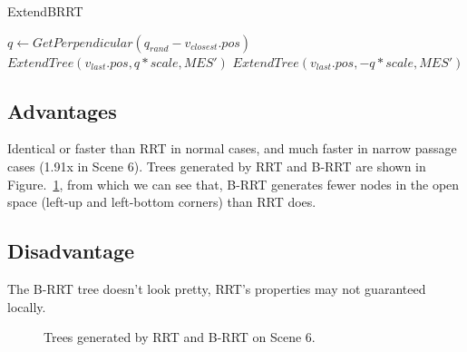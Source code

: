 \documentclass[11pt, oneside]{article}   	%
\begin{document}
\begin{algorithm}                      	
\caption{ExtendBRRT}
\label{alg:extendBRRT}                     	
\begin{algorithmic}
	\State $q \gets GetPerpendicular(q_{rand} - v_{closest}.pos)$
	\State $ExtendTree(v_{last}.pos, q*scale, MES')$
	\State $ExtendTree(v_{last}.pos, -q*scale, MES')$
\EndIf
\end{algorithmic}
\end{algorithm}

\subsection{Advantages}
Identical or faster than RRT in normal cases, and much faster in narrow passage cases (1.91x in Scene 6). 
Trees generated by RRT and B-RRT are shown in Figure.~\ref{fig:trees}, 
from which we can see that, B-RRT generates fewer nodes in the open space (left-up and left-bottom corners) than RRT does.

\subsection{Disadvantage}
The B-RRT tree doesn't look pretty, RRT's properties may not guaranteed locally.

\begin{figure}[h!]
  
  \centering
  \caption{Trees generated by RRT and B-RRT on Scene 6.}
  \label{fig:trees}
\end{figure}
\end{document}
